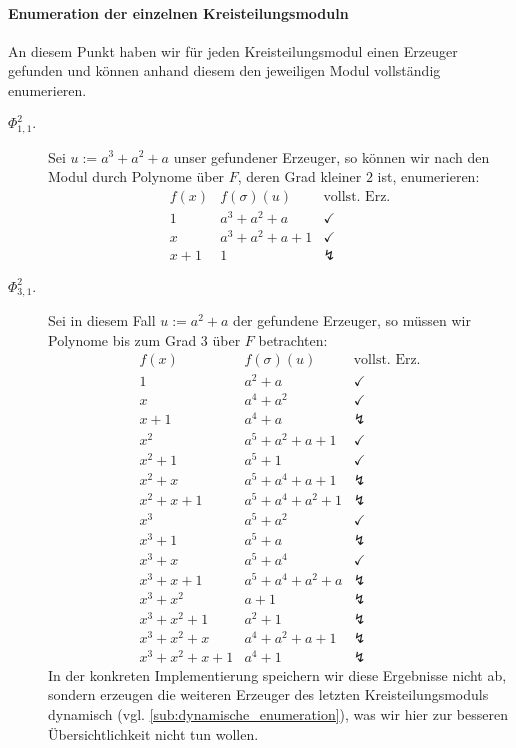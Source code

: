 \paragraph{Enumeration der einzelnen Kreisteilungsmoduln}
An diesem Punkt haben wir für jeden Kreisteilungsmodul einen Erzeuger gefunden
und können anhand diesem den jeweiligen Modul vollständig enumerieren.
\begin{description}
  \item[$\Phi_{1,1}^2.$] Sei $u := a^3+a^2+a$ unser gefundener Erzeuger, so können
    wir nach  den Modul durch Polynome über
    $F$, deren Grad kleiner $2$ ist, enumerieren:
    \[\begin{array}{l|l|l}
      f(x) & f(\sigma)(u) & \text{vollst. Erz.}\\\hline
      1 & a^3+a^2+a & \checkmark\\
      x & a^3+a^2+a+1 & \checkmark\\
      x+1 & 1 & \lightning
      \end{array}\]
  \item [$\Phi_{3,1}^2.$] Sei in diesem Fall $u:= a^2+a$ der gefundene
    Erzeuger, so müssen wir Polynome bis zum Grad $3$ über $F$ betrachten:
    \[\begin{array}{l|l|l}
      f(x) & f(\sigma)(u) & \text{vollst. Erz.}\\\hline
      1 & a^2+a & \checkmark\\
      x & a^4+a^2 & \checkmark\\
      x+1 & a^4+a & \lightning\\
      x^2 & a^5+a^2+a+1 & \checkmark\\
      x^2+1 & a^5+1 & \checkmark\\
      x^2+x & a^5+a^4+a+1 & \lightning\\
      x^2+x+1 & a^5+a^4+a^2+1 & \lightning\\
      x^3 & a^5+a^2 & \checkmark\\
      x^3+1 & a^5+a & \lightning\\
      x^3+x & a^5+a^4 & \checkmark\\
      x^3+x+1 & a^5+a^4+a^2+a & \lightning\\
      x^3+x^2 & a+1 & \lightning\\
      x^3+x^2+1 & a^2+1 & \lightning\\
      x^3+x^2+x & a^4+a^2+a+1 & \lightning\\
      x^3+x^2+x+1 & a^4+1 & \lightning
      \end{array}\]
    In der konkreten Implementierung speichern wir diese Ergebnisse nicht ab,
    sondern erzeugen die weiteren Erzeuger des letzten Kreisteilungsmoduls
    dynamisch (vgl.  
    \autoref{sub:dynamische_enumeration}), was
    wir hier zur besseren Übersichtlichkeit nicht tun wollen.
\end{description}

